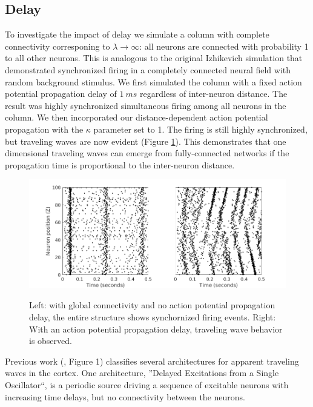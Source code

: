\documentclass[a4paper,11pt]{article}
\begin{document}
\subsection{Delay} \label{sub:delay}
To investigate the impact of delay we simulate a column with complete connectivity corresponing to $\lambda \rightarrow \infty$: all neurons are connected with probability 1 to all other neurons.
This is analogous to the original Izhikevich simulation \cite{izzy_code} that demonstrated synchronized firing in a completely connected neural field with random background stimulus.
We first simulated the column with a fixed action potential propagation delay of $1~ms$ regardless of inter-neuron distance.
The result was highly synchronized simultaneous firing among all neurons in the column.
We then incorporated our distance-dependent action potential propagation with the $\kappa$ parameter set to 1.
The firing is still highly synchronized, but traveling waves are now evident (Figure \ref{fig:delay_waves}).
This demonstrates that one dimensional traveling waves can emerge from fully-connected networks if the propagation time is proportional to the inter-neuron distance.
\begin{figure}[!ht]
 \caption{Left: with global connectivity and no action potential propagation delay, the entire structure shows synchornized firing events. Right: With an action potential propagation delay, traveling wave behavior is observed.}
 \centering
   \includegraphics[width=\textwidth]{fig/DelayWaves}  
 \label{fig:delay_waves}
\end{figure}
Previous work (\cite{ermentrout2001}, Figure 1) classifies several architectures for apparent traveling waves in the cortex.
One architecture, ''Delayed Excitations from a Single Oscillator``, is a periodic source driving a sequence of excitable neurons with increasing time delays, but no connectivity between the neurons.
\end{document}
